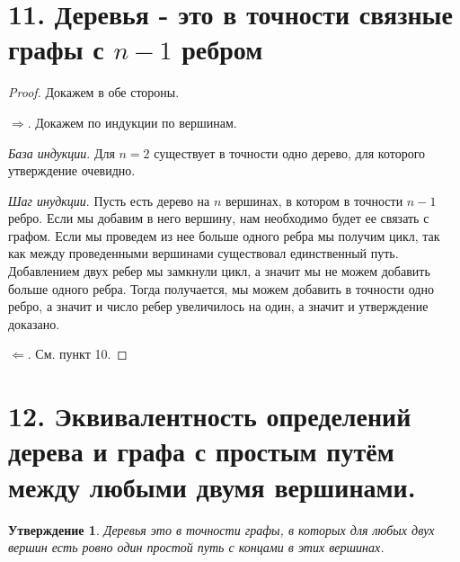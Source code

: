 \documentclass[a4paper,12pt]{article}
\newtheorem*{Statements}{Утверждение}
\begin{document}
    \section*{11. Деревья - это в точности связные графы с $n - 1$ ребром}
    \begin{proof}
        Докажем в обе стороны.

        $\Rightarrow$. Докажем по индукции по вершинам.

        \textit{База индукции}. Для $n = 2$ существует в точности одно дерево, для которого утверждение очевидно.

        \textit{Шаг инудкции}. Пусть есть дерево на $n$ вершинах, в котором в точности $n - 1$ ребро. Если мы добавим в него вершину, нам необходимо будет ее связать с графом. Если мы проведем из нее больше одного ребра мы получим цикл, так как между проведенными вершинами существовал единственный путь. Добавлением двух ребер мы замкнули цикл, а значит мы не можем добавить больше одного ребра. Тогда получается, мы можем добавить в точности одно ребро, а значит и число ребер увеличилось на один, а значит и утверждение доказано.

        $\Leftarrow$. См. пункт 10.


    \end{proof}

    \section*{12. Эквивалентность определений дерева и графа с простым путём
    между любыми двумя вершинами.}
    \begin{Statements}
        Деревья это в точности графы, в которых для любых двух вершин есть ровно
        один простой путь с концами в этих вершинах.
    \end{Statements}
\end{document}
